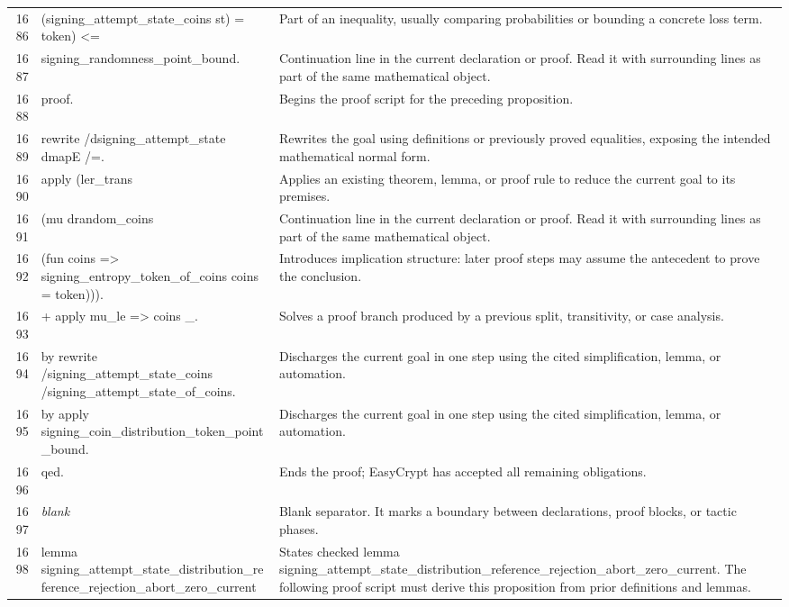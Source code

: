 \documentclass[10pt]{article}
\begin{document}
\begin{longtable}{r L{0.53\textwidth} L{0.37\textwidth}}
1686 & {\ttfamily\scriptsize         (signing\_attempt\_state\_coins st) = token) <=} & Part of an inequality, usually comparing probabilities or bounding a concrete loss term. \\
1687 & {\ttfamily\scriptsize   signing\_randomness\_point\_bound.} & Continuation line in the current declaration or proof.  Read it with surrounding lines as part of the same mathematical object. \\
1688 & {\ttfamily\scriptsize proof.} & Begins the proof script for the preceding proposition. \\
1689 & {\ttfamily\scriptsize rewrite /dsigning\_attempt\_state dmapE /=.} & Rewrites the goal using definitions or previously proved equalities, exposing the intended mathematical normal form. \\
1690 & {\ttfamily\scriptsize apply (ler\_trans} & Applies an existing theorem, lemma, or proof rule to reduce the current goal to its premises. \\
1691 & {\ttfamily\scriptsize   (mu drandom\_coins} & Continuation line in the current declaration or proof.  Read it with surrounding lines as part of the same mathematical object. \\
1692 & {\ttfamily\scriptsize     (fun coins => signing\_entropy\_token\_of\_coins coins = token))).} & Introduces implication structure: later proof steps may assume the antecedent to prove the conclusion. \\
1693 & {\ttfamily\scriptsize + apply mu\_le => coins \_.} & Solves a proof branch produced by a previous split, transitivity, or case analysis. \\
1694 & {\ttfamily\scriptsize   by rewrite /signing\_attempt\_state\_coins /signing\_attempt\_state\_of\_coins.} & Discharges the current goal in one step using the cited simplification, lemma, or automation. \\
1695 & {\ttfamily\scriptsize by apply signing\_coin\_distribution\_token\_point\_bound.} & Discharges the current goal in one step using the cited simplification, lemma, or automation. \\
1696 & {\ttfamily\scriptsize qed.} & Ends the proof; EasyCrypt has accepted all remaining obligations. \\
1697 & {\ttfamily\scriptsize \emph{blank}} & Blank separator.  It marks a boundary between declarations, proof blocks, or tactic phases. \\
1698 & {\ttfamily\scriptsize lemma signing\_attempt\_state\_distribution\_reference\_rejection\_abort\_zero\_current} & States checked lemma signing\_attempt\_state\_distribution\_reference\_rejection\_abort\_zero\_current.  The following proof script must derive this proposition from prior definitions and lemmas. \\

\end{longtable}
\end{document}
